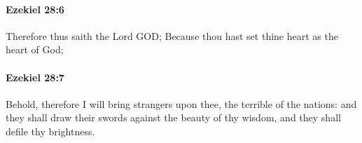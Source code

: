 		\paragraph{Ezekiel 28:6} %
			\label{EZEKIEL-28-6}

			Therefore thus saith the Lord GOD; Because thou hast set thine heart as the heart of God;


		\paragraph{Ezekiel 28:7} %
			\label{EZEKIEL-28-7}

			Behold, therefore I will bring strangers upon thee, the terrible of the nations: and they shall draw their swords against the beauty of thy wisdom, and they shall defile thy brightness.


